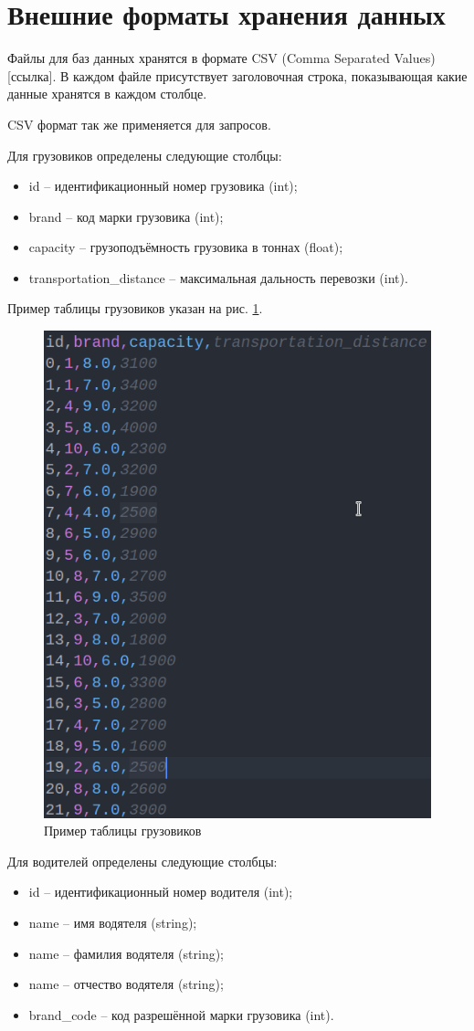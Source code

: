 \section{Внешние форматы хранения данных}

Файлы для баз данных хранятся в формате CSV (Comma Separated Values) [ссылка]. В каждом файле присутствует заголовочная строка, показывающая какие данные хранятся в каждом столбце.

CSV формат так же применяется для запросов.

Для грузовиков определены следующие столбцы:
\begin{itemize}
	\item id -- идентификационный номер грузовика (int);
	\item brand -- код марки грузовика (int);
	\item capacity -- грузоподъёмность грузовика в тоннах (float);
	\item transportation\_distance -- максимальная дальность перевозки (int).
\end{itemize}

Пример таблицы грузовиков указан на рис. \ref{truck_table}.

\begin{figure}[hpt!]
	\centering
	\includegraphics[width=0.5\linewidth]{photo/truck_table}
	\caption{Пример таблицы грузовиков}
	\label{truck_table}
\end{figure}

\newpage
Для водителей определены следующие столбцы:
\begin{itemize}
	\item id -- идентификационный номер водителя (int);
	\item name -- имя водятеля (string);
	\item name -- фамилия водятеля (string);
	\item name -- отчество водятеля (string);
	\item brand\_code -- код разрешённой марки грузовика (int).
\end{itemize}

